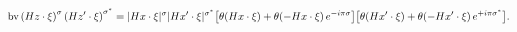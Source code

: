 \begin{equation}
\mbox{bv} \left(H z\cdot\xi\right)^{\sigma} \left(H
z'\cdot\xi\right)^{\sigma^*}= \vert H x\cdot\xi\vert^{\sigma}
\vert H x'\cdot\xi\vert^{\sigma^*} \big{[}\theta(H x\cdot \xi) +
\theta(-H x\cdot\xi)\,e^{-i\pi \sigma } \big{]} \big{[} \theta(H
x'\cdot \xi) + \theta(-H x'\cdot\xi)\,e^{+i\pi \sigma^{*} }
\big{]}.
\end{equation}

